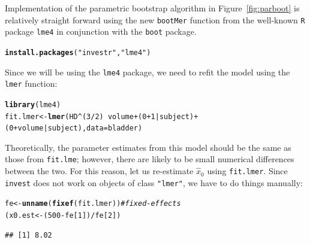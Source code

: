 \documentclass{article}\usepackage[]{graphicx}\usepackage[]{color}
\makeatletter
\newcommand{\hlnum}[1]{\textcolor[rgb]{0.686,0.059,0.569}{#1}}%
\newcommand{\hlstr}[1]{\textcolor[rgb]{0.192,0.494,0.8}{#1}}%
\newcommand{\hlcom}[1]{\textcolor[rgb]{0.678,0.584,0.686}{\textit{#1}}}%
\newcommand{\hlopt}[1]{\textcolor[rgb]{0,0,0}{#1}}%
\newcommand{\hlstd}[1]{\textcolor[rgb]{0.345,0.345,0.345}{#1}}%
\newcommand{\hlkwb}[1]{\textcolor[rgb]{0.69,0.353,0.396}{#1}}%
\newcommand{\hlkwc}[1]{\textcolor[rgb]{0.333,0.667,0.333}{#1}}%
\newcommand{\hlkwd}[1]{\textcolor[rgb]{0.737,0.353,0.396}{\textbf{#1}}}%
\newenvironment{kframe}{%
 \def\at@end@of@kframe{}%
 \ifinner\ifhmode%
  \def\at@end@of@kframe{\end{minipage}}%
  \begin{minipage}{\columnwidth}%
 \fi\fi%
 \def\FrameCommand##1{\hskip\@totalleftmargin \hskip-\fboxsep
 \colorbox{shadecolor}{##1}\hskip-\fboxsep
     \hskip-\linewidth \hskip-\@totalleftmargin \hskip\columnwidth}%
 \MakeFramed {\advance\hsize-\width
   \@totalleftmargin\z@ \linewidth\hsize
   \@setminipage}}%
 {\par\unskip\endMakeFramed%
 \at@end@of@kframe}
\newenvironment{knitrout}{}{} %
\makeatother
\begin{document}
Implementation of the parametric bootstrap algorithm in Figure~\ref{fig:parboot} is relatively straight forward using the new \texttt{bootMer} function from the well-known \texttt{R} package \texttt{lme4} \citep{bates-lme4-2014} in conjunction with the \texttt{boot} package.
\begin{knitrout}
\color{fgcolor}\begin{kframe}
\begin{alltt}
\hlkwd{install.packages}\hlstd{(}\hlstr{"investr"}\hlstd{,} \hlstr{"lme4"}\hlstd{)}
\end{alltt}
\end{kframe}
\end{knitrout}

Since we will be using the \texttt{lme4} package, we need to refit the model using the \texttt{lmer} function:
\begin{knitrout}
\color{fgcolor}\begin{kframe}
\begin{alltt}
\hlkwd{library}\hlstd{(lme4)}
\hlstd{fit.lmer} \hlkwb{<-} \hlkwd{lmer}\hlstd{(HD} \hlopt{^} \hlstd{(}\hlnum{3} \hlopt{/} \hlnum{2}\hlstd{)} \hlopt{~} \hlstd{volume} \hlopt{+} \hlstd{(}\hlnum{0} \hlopt{+} \hlnum{1} \hlopt{|} \hlstd{subject)} \hlopt{+}
                           \hlstd{(}\hlnum{0} \hlopt{+} \hlstd{volume} \hlopt{|} \hlstd{subject),} \hlkwc{data} \hlstd{= bladder)}
\end{alltt}
\end{kframe}
\end{knitrout}
Theoretically, the parameter estimates from this model should be the same as those from \texttt{fit.lme}; however, there are likely to be small numerical differences between the two.  For this reason, let us re-estimate $\widehat{x}_0$ using \texttt{fit.lmer}.  Since \texttt{invest} does not work on objects of class \texttt{"lmer"}, we have to do things manually:
\begin{knitrout}
\color{fgcolor}\begin{kframe}
\begin{alltt}
\hlstd{fe} \hlkwb{<-} \hlkwd{unname}\hlstd{(}\hlkwd{fixef}\hlstd{(fit.lmer))}  \hlcom{# fixed-effects}
\hlstd{(x0.est} \hlkwb{<-} \hlstd{(}\hlnum{500} \hlopt{-} \hlstd{fe[}\hlnum{1}\hlstd{])} \hlopt{/} \hlstd{fe[}\hlnum{2}\hlstd{])}
\end{alltt}
\begin{verbatim}
## [1] 8.02
\end{verbatim}
\end{kframe}
\end{knitrout}
\end{document}

